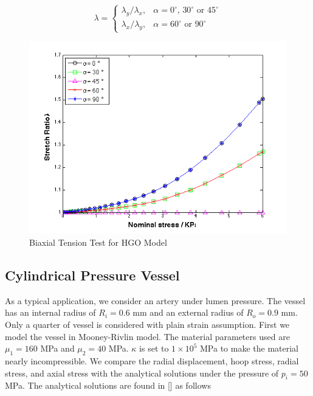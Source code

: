 \begin{equation}
\label{stretchratio}
\lambda = 
\begin{cases}
	\lambda_y/\lambda_x, & \text{$\alpha = 0^\circ$, $30^\circ$ or $45^\circ$} \\
	\lambda_x/\lambda_y, & \text{$\alpha = 60^\circ$ or $90^\circ$}
\end{cases}
\end{equation}
 
\begin{figure}[h!]
\centering
\includegraphics[width=.6\textwidth]{./figures/biaxial2.png}
\caption{Biaxial Tension Test for HGO Model}
\label{fig:biaxial2}
\end{figure}

\subsection{Cylindrical Pressure Vessel}
As a typical application, we consider an artery under lumen pressure. The vessel has an internal radius of $R_i = 0.6$ mm and an external radius of $R_o = 0.9$ mm. Only a quarter of vessel is considered with plain strain assumption. First we model the vessel in Mooney-Rivlin model. The material parameters used are $\mu_1 = 160$ MPa and $\mu_2 = 40$ MPa. $\kappa$ is set to $1 \times 10^5$ MPa to make the material nearly incompressible. We compare the radial displacement, hoop stress, radial stress, and axial stress with the analytical solutions under the pressure of $p_i = 50$ MPa. The analytical solutions are found in [] as follows 















